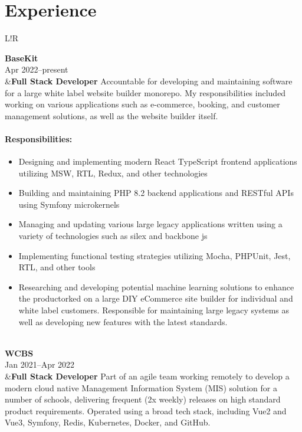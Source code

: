 \documentclass[10pt]{article}
\newcommand\VRule{\color{lightgray}\vrule width 0.5pt}
\begin{document}
\section*{Experience}
\begin{longtable}{L!{\VRule}R}

{\bf BaseKit}\\
Apr 2022--present\\
&{\bf Full Stack Developer}\newline
Accountable for developing and maintaining software for a large white label website builder monorepo. My responsibilities included working on various applications such as e-commerce, booking, and customer management solutions, as well as the website builder itself.

\vspace{-3mm}
\paragraph{Responsibilities:}
\begin{itemize}[noitemsep,topsep=0pt]
    \item Designing and implementing modern React TypeScript frontend applications utilizing MSW, RTL, Redux, and other technologies
    \item Building and maintaining PHP 8.2 backend applications and RESTful APIs using Symfony microkernels
    \item Managing and updating various large legacy applications written using a variety of technologies such as silex and backbone js
    \item Implementing functional testing strategies utilizing Mocha, PHPUnit, Jest, RTL, and other tools
    \item Researching and developing potential machine learning solutions to enhance the productorked on a large DIY eCommerce site builder for individual and white label customers. Responsible for maintaining large legacy systems as well as developing new features with the latest standards.
\end{itemize}
\\

{\bf WCBS}\\
Jan 2021--Apr 2022\\
&{\bf Full Stack Developer}\newline
Part of an agile team working remotely to develop a modern cloud native Management Information System (MIS) solution for a number of schools, delivering frequent (2x weekly) releases on high standard product requirements. Operated using a broad tech stack, including Vue2 and Vue3, Symfony, Redis, Kubernetes, Docker, and GitHub.


\end{longtable}
\end{document}
